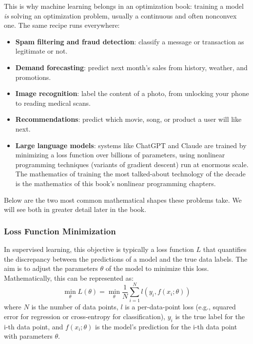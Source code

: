 This is why machine learning belongs in an optimization book: training a model \emph{is} solving an optimization problem, usually a continuous and often nonconvex one.  The same recipe runs everywhere:
\begin{itemize}
\item \textbf{Spam filtering and fraud detection}: classify a message or transaction as legitimate or not.
\item \textbf{Demand forecasting}: predict next month's sales from history, weather, and promotions.
\item \textbf{Image recognition}: label the content of a photo, from unlocking your phone to reading medical scans.
\item \textbf{Recommendations}: predict which movie, song, or product a user will like next.
\item \textbf{Large language models}: systems like ChatGPT and Claude are trained by minimizing a loss function over billions of parameters, using nonlinear programming techniques (variants of gradient descent) run at enormous scale.  The mathematics of training the most talked-about technology of the decade is the mathematics of this book's nonlinear programming chapters.
\end{itemize}
Below are the two most common mathematical shapes these problems take.  We will see both in greater detail later in the book.

\subsubsection*{Loss Function Minimization}

In supervised learning, this objective is typically a loss function \( L \) that quantifies the discrepancy between the predictions of a model and the true data labels. The aim is to adjust the parameters \( \theta \) of the model to minimize this loss. Mathematically, this can be represented as:
\begin{equation}
\min_{\theta} L(\theta) = \min_{\theta} \frac{1}{N} \sum_{i=1}^{N} l(y_i, f(x_i; \theta))
\end{equation}
where \( N \) is the number of data points, \( l \) is a per-data-point loss (e.g., squared error for regression or cross-entropy for classification), \( y_i \) is the true label for the i-th data point, and \( f(x_i; \theta) \) is the model's prediction for the i-th data point with parameters \( \theta \).

